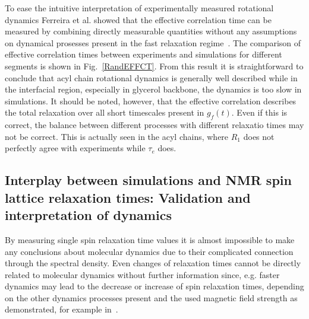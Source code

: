 \documentclass[aps,prl,superscriptaddress,twocolumn]{revtex4}
\begin{document}
To ease the intuitive interpretation of experimentally measured rotational dynamics
Ferreira et al. showed that the effective correlation time can be measured by combining 
directly measurable quantities without any assumptions on dynamical prosesses present in the 
fast relaxation regime~\cite{ferreira15}. 
The comparison of effective correlation times
between experiments and simulations for different segments is shown in Fig.~\ref{RandEFFCT}.
From this result it is straightforward to conclude that acyl chain rotational dynamics 
is generally well described while in the interfacial region, especially in glycerol backbone,
the dynamics is too slow in simulations. It should be noted, however, that the effective correlation
describes the total relaxation over all short timescales present in $g_f(t)$. Even if this is 
correct, the balance between different processes with different relaxatio times may not be
correct. This is actually seen in the acyl chains, where $R_1$ does not perfectly agree with
experiments while $\tau_e$ does.  



\subsection{Interplay between simulations and NMR spin lattice relaxation times: Validation and interpretation of dynamics}

By measuring single spin relaxation time values it is almost impossible to make any conclusions
about molecular dynamics due to their complicated connection through the spectral density.
Even changes of relaxation times cannot be directly related to molecular dynamics without further
information since, e.g. faster dynamics may lead to the decrease or increase of spin relaxation times,
depending on the other dynamics processes present and the used magnetic field strength as demonstrated, for example in~\cite{ferreira15}.
\end{document}
